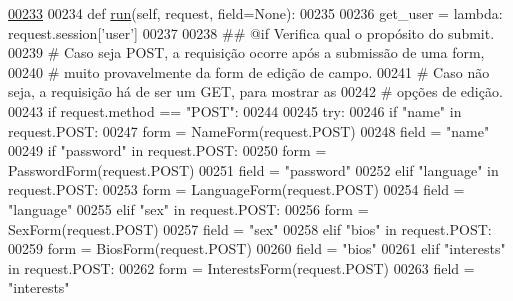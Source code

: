 \begin{DoxyCode}
\hypertarget{classProfile_1_1ProfileUnit_1_1UiFullProfile_l00233}{}\hyperlink{classProfile_1_1ProfileUnit_1_1UiFullProfile_a7a7747246b627020a345f7a3eac27778}{00233} 
00234     \textcolor{keyword}{def }\hyperlink{classProfile_1_1ProfileUnit_1_1UiFullProfile_a7a7747246b627020a345f7a3eac27778}{run}(self, request, field=None):
00235 
00236         get\_user = \textcolor{keyword}{lambda}: request.session[\textcolor{stringliteral}{'user'}]
00237 
00238         \textcolor{comment}{## @if Verifica qual o propósito do submit.}
00239         \textcolor{comment}{#   Caso seja POST, a requisição ocorre após a submissão de uma form,}
00240         \textcolor{comment}{#       muito provavelmente da form de edição de campo.}
00241         \textcolor{comment}{#   Caso não seja, a requisição há de ser um GET, para mostrar as}
00242         \textcolor{comment}{#       opções de edição.}
00243         \textcolor{keywordflow}{if} request.method == \textcolor{stringliteral}{"POST"}:
00244 
00245             \textcolor{keywordflow}{try}:
00246                 \textcolor{keywordflow}{if}   \textcolor{stringliteral}{"name"} \textcolor{keywordflow}{in} request.POST:
00247                     form = NameForm(request.POST)
00248                     field = \textcolor{stringliteral}{"name"}
00249                 \textcolor{keywordflow}{if}  \textcolor{stringliteral}{"password"} \textcolor{keywordflow}{in} request.POST:
00250                     form = PasswordForm(request.POST)
00251                     field = \textcolor{stringliteral}{"password"}
00252                 \textcolor{keywordflow}{elif} \textcolor{stringliteral}{"language"} \textcolor{keywordflow}{in} request.POST:
00253                     form = LanguageForm(request.POST)
00254                     field = \textcolor{stringliteral}{"language"}
00255                 \textcolor{keywordflow}{elif} \textcolor{stringliteral}{"sex"} \textcolor{keywordflow}{in} request.POST:
00256                     form = SexForm(request.POST)
00257                     field = \textcolor{stringliteral}{"sex"}
00258                 \textcolor{keywordflow}{elif} \textcolor{stringliteral}{"bios"} \textcolor{keywordflow}{in} request.POST:
00259                     form = BiosForm(request.POST)
00260                     field = \textcolor{stringliteral}{"bios"}
00261                 \textcolor{keywordflow}{elif} \textcolor{stringliteral}{"interests"} \textcolor{keywordflow}{in} request.POST:
00262                     form = InterestsForm(request.POST)
00263                     field = \textcolor{stringliteral}{"interests"}

\end{DoxyCode}
